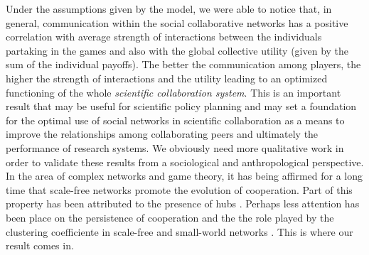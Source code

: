 \documentclass{bmcart}
\begin{document}
Under the assumptions given by the model, we were able to notice that, in
general, communication within the social collaborative networks has a positive
correlation with average strength of interactions between the individuals
partaking in the games and also with the global collective utility (given by the
sum of the individual payoffs). The better the communication among players, the
higher the strength of interactions and the utility leading to an optimized
functioning of the whole \emph{scientific collaboration system}. This is an
important result that may be useful for scientific policy planning and may set a
foundation for the optimal use of social networks in scientific collaboration as
a means to improve the relationships among collaborating peers and ultimately
the performance of research systems.  We obviously need more qualitative work in
order to validate these results from a
sociological and anthropological perspective.\\

  
  

{\color {red}In the area of complex networks and game theory, it has being affirmed for a
long time that scale-free networks promote the evolution of cooperation. Part of
this property has been attributed to the presence of hubs
\cite{Santos-etal:2005,Szolnoki-etal:2008,Du-etal:2008,Li-etal:2009,Yang-etal:2009,Lei-etal:2009,Liu-etal:2010,Cheng-etal:2010B,Li-etal:2014,Li-etal:2015,Ichinose:2017}. Perhaps
less attention has been place on the persistence of cooperation and the the role
played by the clustering coefficiente in scale-free and small-world networks
\cite{Kim-etal:2002,Masuda-etal:2003,Wu-etal:2005,Wu-etal:2006,Guan-etal:2006,Fu:2007,Zhang-etal:2007,Thibert-Plante-etal:2007,Chen-etal:2008}. This is where our result comes in.} \\
\end{document}
